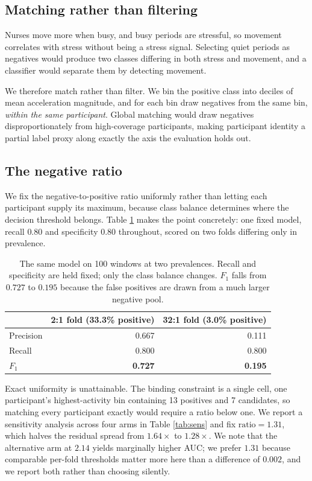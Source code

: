 \documentclass{article}
\begin{document}
\subsection{Matching rather than filtering}

Nurses move more when busy, and busy periods are stressful, so movement
correlates with stress without being a stress signal. Selecting quiet periods
as negatives would produce two classes differing in both stress and movement,
and a classifier would separate them by detecting movement.

We therefore match rather than filter. We bin the positive class into deciles
of mean acceleration magnitude, and for each bin draw negatives from the same
bin, \emph{within the same participant}. Global matching would draw negatives
disproportionately from high-coverage participants, making participant identity
a partial label proxy along exactly the axis the evaluation holds out.

\subsection{The negative ratio}

We fix the negative-to-positive ratio uniformly rather than letting each
participant supply its maximum, because class balance determines where the
decision threshold belongs. Table \ref{tab:f1} makes the point concretely: one
fixed model, recall $0.80$ and specificity $0.80$ throughout, scored on two
folds differing only in prevalence.

\begin{table}[t]
\caption{The same model on 100 windows at two prevalences. Recall and
specificity are held fixed; only the class balance changes. $F_1$ falls from
$0.727$ to $0.195$ because the false positives are drawn from a much larger
negative pool.}
\label{tab:f1}
\centering
\begin{tabular}{lrr}
\toprule
 & 2:1 fold (33.3\% positive) & 32:1 fold (3.0\% positive) \\
\midrule
Precision & 0.667 & 0.111 \\
Recall    & 0.800 & 0.800 \\
$F_1$     & \textbf{0.727} & \textbf{0.195} \\
\bottomrule
\end{tabular}
\end{table}

Exact uniformity is unattainable. The binding constraint is a single cell, one
participant's highest-activity bin containing 13 positives and 7 candidates, so
matching every participant exactly would require a ratio below one. We report a
sensitivity analysis across four arms in Table \ref{tab:sens} and fix
$\text{ratio} = 1.31$, which halves the residual spread from $1.64\times$ to
$1.28\times$. We note that the alternative arm at $2.14$ yields marginally
higher AUC; we prefer $1.31$ because comparable per-fold thresholds matter more
here than a difference of $0.002$, and we report both rather than choosing
silently.
\end{document}

